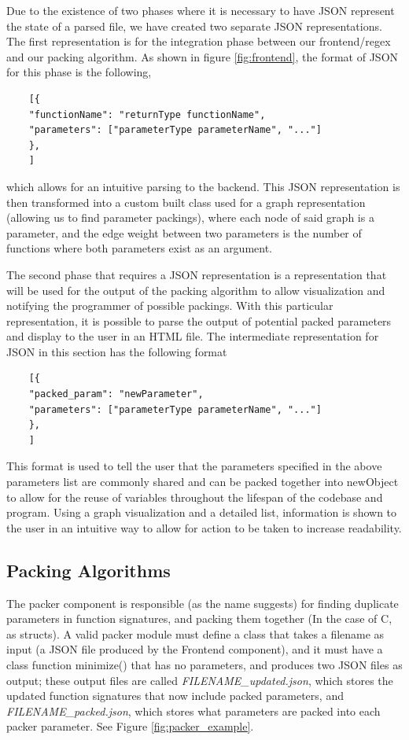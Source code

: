 \documentclass{article}
\begin{document}
Due to the existence of two phases where it is necessary to have JSON represent the state of a parsed file, we have created two separate JSON representations. The first representation is for the integration phase between our frontend/regex and our packing algorithm. As shown in figure \ref{fig:frontend}, the format of JSON for this phase is the following,

\begin{verbatim}
    [{
    "functionName": "returnType functionName",
    "parameters": ["parameterType parameterName", "..."]
    },
    ]
\end{verbatim}

which allows for an intuitive parsing to the backend. This JSON representation is then transformed into a custom built class used for a graph representation (allowing us to find parameter packings), where each node of said graph is a parameter, and the edge weight between two parameters is the number of functions where both parameters exist as an argument. 

The second phase that requires a JSON representation is a representation that will be used for the output of the packing algorithm to allow visualization and notifying the programmer of possible packings. With this particular representation, it is possible to parse the output of potential packed parameters and display to the user in an HTML file. The intermediate representation for JSON in this section has the following format

\begin{verbatim}
    [{
    "packed_param": "newParameter",
    "parameters": ["parameterType parameterName", "..."]
    },
    ]
\end{verbatim}

This format is used to tell the user that the parameters specified in the above parameters list are commonly shared and can be packed together into newObject to allow for the reuse of variables throughout the lifespan of the codebase and program. Using a graph visualization and a detailed list, information is shown to the user in an intuitive way to allow for action to be taken to increase readability.

\subsection{Packing Algorithms}

\noindent The packer component is responsible (as the name suggests) for finding duplicate parameters in function signatures, and packing them together (In the case of C, as structs). A valid packer module must define a class that takes a filename as input (a JSON file produced by the Frontend component), and it must have a class function minimize() that has no parameters, and produces two JSON files as output; these output files are called \textit{FILENAME\_updated.json}, which stores the updated function signatures that now include packed parameters, and \textit{FILENAME\_packed.json}, which stores what parameters are packed into each packer parameter. See Figure \ref{fig:packer_example}.
\end{document}
